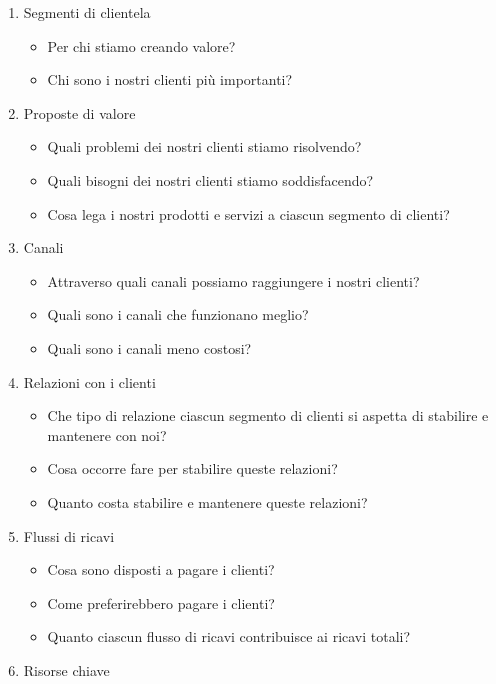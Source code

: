 \documentclass[10pt,a4paper,fleqn,oneside]{book}
\begin{document}
\begin{enumerate}
    \item Segmenti di clientela
    \begin{itemize}
        \item Per chi stiamo creando valore?
        \item Chi sono i nostri clienti più importanti?
    \end{itemize}
    \item Proposte di valore
    \begin{itemize}
        \item Quali problemi dei nostri clienti stiamo risolvendo?
        \item Quali bisogni dei nostri clienti stiamo soddisfacendo?
        \item Cosa lega i nostri prodotti e servizi a ciascun segmento di
        clienti?
    \end{itemize}
    \item Canali
    \begin{itemize}
        \item Attraverso quali canali possiamo raggiungere i nostri clienti? 
        \item Quali sono i canali che funzionano meglio? 
        \item Quali sono i canali meno costosi?
    \end{itemize}
    \item Relazioni con i clienti
    \begin{itemize}
        \item Che tipo di relazione ciascun segmento di clienti si aspetta di
        stabilire e mantenere con noi?
        \item Cosa occorre fare per stabilire queste relazioni?
        \item Quanto costa stabilire e mantenere queste relazioni?
    \end{itemize}
    \item Flussi di ricavi
    \begin{itemize}
        \item Cosa sono disposti a pagare i clienti? 
        \item Come preferirebbero pagare i clienti? 
        \item Quanto ciascun flusso di ricavi contribuisce ai ricavi totali?
    \end{itemize}
    \item Risorse chiave
    \begin{itemize}

\end{itemize}
\end{enumerate}
\end{document}

